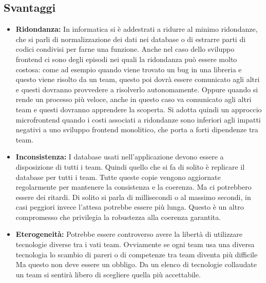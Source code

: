 \subsection*{Svantaggi}
\begin{itemize}

\item \textbf{Ridondanza:}
In informatica si è addestrati a ridurre al minimo ridondanze, che si parli di normalizzazione
 dei dati nei database o di estrarre parti di codici condivisi per farne una funzione.
Anche nel caso dello sviluppo frontend ci sono degli episodi nei quali la ridondanza può
 essere molto costosa: come ad esempio quando viene trovato un bug in una libreria e 
 questo viene risolto da un team, questo poi dovrà essere comunicato agli altri e questi 
 dovranno provvedere a risolverlo autonomamente. Oppure quando si rende un processo più 
 veloce, anche in questo caso va comunicato agli altri team e questi dovranno apprendere
  la scoperta.
Si adotta quindi un approccio microfrontend quando i costi associati a ridondanze sono 
inferiori agli impatti negativi a uno sviluppo frontend monolitico, che porta a forti 
dipendenze tra team.




\item \textbf{Inconsistenza:}
I database usati nell’applicazione devono essere a disposizione di tutti i team. 
Quindi quello che si fa di solito è replicare il database per tutti i team. 
Tutte queste copie vengono aggiornate regolarmente per mantenere la consistenza e la coerenza.
 Ma ci potrebbero essere dei ritardi. Di solito si parla di millisecondi o al massimo secondi,
  in casi peggiori invece l’attesa potrebbe essere più lunga.
Questo è un altro compromesso che privilegia la robustezza alla coerenza garantita.

\item \textbf{Eterogeneità:}
Potrebbe essere controverso avere la libertà di utilizzare tecnologie diverse tra i vati team.
 Ovviamente se ogni team usa una diversa tecnologia lo scambio di pareri o di competenze 
 tra team diventa più difficile
Ma questo non deve essere un obbligo. Da un elenco di tecnologie collaudate un team si
 sentirà libero di scegliere quella più accettabile.
\end{itemize}